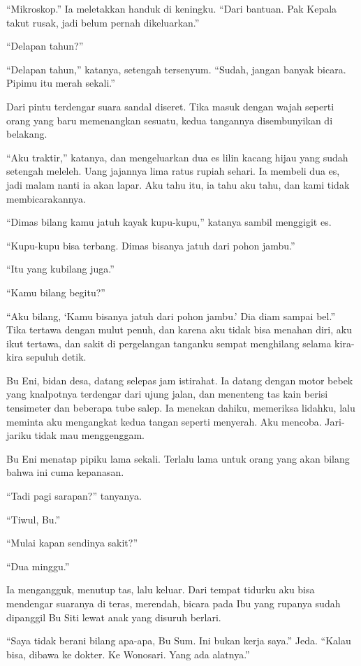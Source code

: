 \documentclass[11pt,twoside,openany]{book}
\begin{document}
``Mikroskop.'' Ia meletakkan handuk di keningku. ``Dari bantuan. Pak Kepala takut rusak, jadi belum pernah dikeluarkan.''

``Delapan tahun?''

``Delapan tahun,'' katanya, setengah tersenyum. ``Sudah, jangan banyak bicara. Pipimu itu merah sekali.''

Dari pintu terdengar suara sandal diseret. Tika masuk dengan wajah seperti orang yang baru memenangkan sesuatu, kedua tangannya disembunyikan di belakang.

``Aku traktir,'' katanya, dan mengeluarkan dua es lilin kacang hijau yang sudah setengah meleleh. Uang jajannya lima ratus rupiah sehari. Ia membeli dua es, jadi malam nanti ia akan lapar. Aku tahu itu, ia tahu aku tahu, dan kami tidak membicarakannya.

``Dimas bilang kamu jatuh kayak kupu-kupu,'' katanya sambil menggigit es.

``Kupu-kupu bisa terbang. Dimas bisanya jatuh dari pohon jambu.''

``Itu yang kubilang juga.''

``Kamu bilang begitu?''

``Aku bilang, `Kamu bisanya jatuh dari pohon jambu.' Dia diam sampai bel.'' Tika tertawa dengan mulut penuh, dan karena aku tidak bisa menahan diri, aku ikut tertawa, dan sakit di pergelangan tanganku sempat menghilang selama kira-kira sepuluh detik.

Bu Eni, bidan desa, datang selepas jam istirahat. Ia datang dengan motor bebek yang knalpotnya terdengar dari ujung jalan, dan menenteng tas kain berisi tensimeter dan beberapa tube salep. Ia menekan dahiku, memeriksa lidahku, lalu meminta aku mengangkat kedua tangan seperti menyerah. Aku mencoba. Jari-jariku tidak mau menggenggam.

Bu Eni menatap pipiku lama sekali. Terlalu lama untuk orang yang akan bilang bahwa ini cuma kepanasan.

``Tadi pagi sarapan?'' tanyanya.

``Tiwul, Bu.''

``Mulai kapan sendinya sakit?''

``Dua minggu.''

Ia mengangguk, menutup tas, lalu keluar. Dari tempat tidurku aku bisa mendengar suaranya di teras, merendah, bicara pada Ibu yang rupanya sudah dipanggil Bu Siti lewat anak yang disuruh berlari.

``Saya tidak berani bilang apa-apa, Bu Sum. Ini bukan kerja saya.'' Jeda. ``Kalau bisa, dibawa ke dokter. Ke Wonosari. Yang ada alatnya.''
\end{document}
